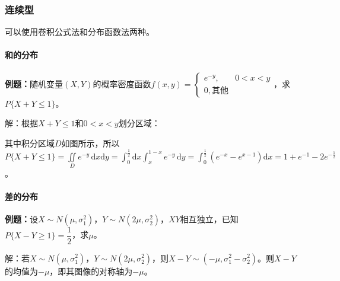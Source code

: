 \subsubsection{连续型}

可以使用卷积公式法和分布函数法两种。

\paragraph{和的分布} \leavevmode \medskip

\textbf{例题：}随机变量$(X,Y)$的概率密度函数$f(x,y)=\left\{\begin{array}{ll}
    e^{-y}, & 0<x<y \\
    0, \text{其他}
\end{array}\right.$，求$P\{X+Y\leqslant1\}$。

解：根据$X+Y\leqslant1$和$0<x<y$划分区域：

\begin{multicols}{2}
    

    其中积分区域$D$如图所示，所以$P\{X+Y\leqslant1\}=\iint\limits_De^{-y}\,\textrm{d}x\textrm{d}y=\int_0^{\frac{1}{2}}\textrm{d}x\int_x^{1-x}e^{-y}\,\textrm{d}y=\int_0^{\frac{1}{2}}(e^{-x}-e^{x-1})\textrm{d}x=1+e^{-1}-2e^{-\frac{1}{2}}$。

\end{multicols}

\paragraph{差的分布} \leavevmode \medskip

\textbf{例题：}设$X\sim N(\mu,\sigma_1^2)$，$Y\sim N(2\mu,\sigma_2^2)$，$XY$相互独立，已知$P\{X-Y\geqslant1\}=\dfrac{1}{2}$，求$\mu$。

解：若$X\sim N(\mu,\sigma_1^2)$，$Y\sim N(2\mu,\sigma_2^2)$，则$X-Y\sim(-\mu,\sigma_1^2-\sigma_2^2)$。则$X-Y$的均值为$-\mu$，即其图像的对称轴为$-\mu$。

